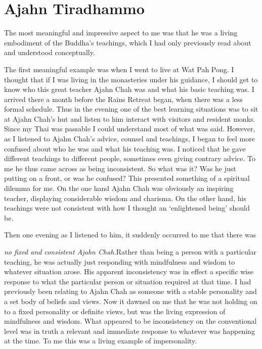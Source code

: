 \section{Ajahn Tiradhammo}

The most meaningful and impressive aspect to me was that he was a living
embodiment of the Buddha's teachings, which I had only previously read
about and understood conceptually. 

The first meaningful example was when I went to live at Wat Pah Pong. I
thought that if I was living in the monasteries under his guidance, I
should get to know who this great teacher Ajahn Chah was and what his
basic teaching was. I arrived there a month before the Rains Retreat
began, when there was a less formal schedule. Thus in the evening one of
the best learning situations was to sit at Ajahn Chah's hut and listen
to him interact with visitors and resident monks. Since my Thai was
passable I could understand most of what was said. However, as I
listened to Ajahn Chah's advice, counsel and teachings, I began to feel
more confused about who he was and what his teaching was. I noticed that
he gave different teachings to different people, sometimes even giving
contrary advice. To me he thus came across as being inconsistent. So
what was it? Was he just putting on a front, or was he confused? This
presented something of a spiritual dilemma for me. On the one hand Ajahn
Chah was obviously an inspiring teacher, displaying considerable wisdom
and charisma. On the other hand, his teachings were not consistent with
how I thought an `enlightened being' should be. 

Then one evening as I listened to him, it suddenly occurred to me that
there was

\emph{no fixed and consistent Ajahn Chah.}Rather than being a person
with a particular teaching, he was actually just responding with
mindfulness and wisdom to whatever situation arose. His apparent
inconsistency was in effect a specific wise response to what the
particular person or situation required at that time. I had previously
been relating to Ajahn Chah as someone with a stable personality and a
set body of beliefs and views. Now it dawned on me that he was not
holding on to a fixed personality or definite views, but was the living
expression of mindfulness and wisdom. What appeared to be inconsistency
on the conventional level was in truth a relevant and immediate response
to whatever was happening at the time. To me this was a living example
of impersonality. 

